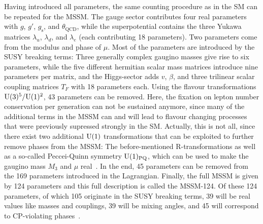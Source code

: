\noindent Having introduced all parameters, the same counting procedure as in the SM can be repeated for the MSSM. The gauge sector contributes four real parameters with $g$, $g'$, $g_\mathrm{s}$, and $\theta_\mathrm{QCD}$, while the superpotential contains the three Yukawa matrices $\lambda_u$, $\lambda_d$, and $\lambda_e$ (each contributing 18 parameters). Two parameters come from the modulus and phase of $\mu$.
Most of the parameters are introduced by the SUSY breaking terms: Three generally complex gaugino masses give rise to six parameters, while the five different hermitian scalar mass matrices introduce nine parameters per matrix, and the Higgs-sector adds $v$, $\beta$, and three trilinear scalar coupling matrices $T_F$ with 18 parameters each.
Using the flavour transformations $\mathrm{U}(3)^5/\mathrm{U}(1)^2$, 43 parameters can be removed. Here, the fixation on lepton number conservation per generation can not be sustained anymore, since many of the additional terms in the MSSM can and will lead to flavour changing processes that were previously supressed strongly in the SM.
Actually, this is not all, since there exist two additional $\mathrm{U}(1)$ transformations that can be exploited to further remove phases from the MSSM: The before-mentioned R-transformations as well as a so-called Peccei-Quinn symmetry $\mathrm{U}(1)_\mathrm{PQ}$, which can be used to make the gaugino mass $M_3$ and $\mu$ real~\cite{haber}.
In the end, 45 parameters can be removed from the 169 parameters introduced in the Lagrangian.
Finally, the full MSSM is given by 124 parameters and this full description is called the MSSM-124. Of these 124 parameters, of which 105 originate in the SUSY breaking terms, 39 will be real values like masses and couplings, 39 will be mixing angles, and 45 will correspond to CP-violating phases~\cite{haber, pdg}.

